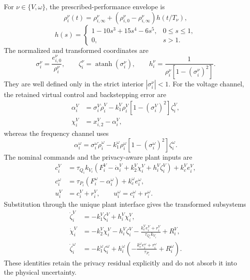 \documentclass[journal]{IEEEtran}
\begin{document}
For $\nu\in\{V,\omega\}$, the prescribed-performance envelope is
\begin{equation}
\rho_i^\nu(t)
=\rho_{i,\infty}^\nu+
  (\rho_{i,0}^\nu-\rho_{i,\infty}^\nu)h(t/T_\nu),
\label{eq:ppc_envelope}
\end{equation}
\begin{equation}
h(s)=
\begin{cases}
1-10s^3+15s^4-6s^5,&0\leq s\leq1,\\
0,&s>1.
\end{cases}
\label{eq:ppc_shape}
\end{equation}
The normalized and transformed coordinates are
\begin{equation}
\sigma_i^\nu=\frac{e_{i,0}^\nu}{\rho_i^\nu},
\qquad
\zeta_i^\nu=\operatorname{atanh}(\sigma_i^\nu),
\qquad
h_i^\nu=\frac{1}{\rho_i^\nu[1-(\sigma_i^\nu)^2]}.
\label{eq:ppc_coordinates}
\end{equation}
They are well defined only in the strict interior $|\sigma_i^\nu|<1$.
For the voltage channel, the retained virtual control and backstepping error are
\begin{align}
\alpha_i^V
&=\sigma_i^V\dot\rho_i^V
-k_1^V\rho_i^V[1-(\sigma_i^V)^2]\zeta_i^V,
\nonumber\\
\chi_i^V&=x_{i,2}^V-\alpha_i^V,
\label{eq:voltage_virtual_control}
\end{align}
whereas the frequency channel uses
\begin{equation}
\alpha_i^\omega
=\sigma_i^\omega\dot\rho_i^\omega
-k_1^\omega\rho_i^\omega[1-(\sigma_i^\omega)^2]\zeta_i^\omega.
\label{eq:frequency_virtual_control}
\end{equation}
The nominal commands and the privacy-aware plant inputs are
\begin{align}
c_i^V
&=\tau_{Q_i}k_{V_i}\!\left(F_i^V-\dot\alpha_i^V+k_2^V\chi_i^V
+h_i^V\zeta_i^V\right)+k_c^V e_i^V,
\label{eq:local_voltage_command}\\
c_i^\omega
&=\tau_{P_i}(F_i^\omega-\alpha_i^\omega)+k_c^\omega e_i^\omega,
\label{eq:local_frequency_command}\\
u_i^V&=c_i^V+r_i^V,
\qquad
u_i^\omega=c_i^\omega+r_i^\omega.
\label{eq:local_reconstructed_inputs}
\end{align}
Substitution through the unique plant interface gives the transformed
subsystems
\begin{align}
\dot\zeta_i^V
&=-k_1^V\zeta_i^V+h_i^V\chi_i^V,
\nonumber\\
\dot\chi_i^V
&=-k_2^V\chi_i^V-h_i^V\zeta_i^V
-\frac{k_c^V e_i^V+r_i^V}{\tau_{Q_i}k_{V_i}}+R_i^V,
\label{eq:local_voltage_subsystem}\\
\dot\zeta_i^\omega
&=-k_1^\omega\zeta_i^\omega
+h_i^\omega\!\left(
-\frac{k_c^\omega e_i^\omega+r_i^\omega}{\tau_{P_i}}
+R_i^\omega\right).
\label{eq:local_frequency_subsystem}
\end{align}
These identities retain the privacy residual explicitly and do not absorb it
into the physical uncertainty.
\end{document}
